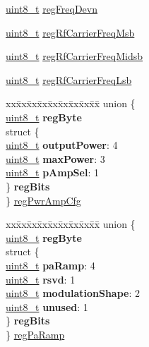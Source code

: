 \begin{DoxyCompactItemize}
\begin{tabbing}
\end{tabbing}\item 
\hyperlink{vl53l0x__types_8h_aba7bc1797add20fe3efdf37ced1182c5}{uint8\+\_\+t} \hyperlink{structFSK__Register__Map_a9265cac0c8d83f3c76e1a5fb5015ac88}{reg\+Freq\+Devn}
\item 
\hyperlink{vl53l0x__types_8h_aba7bc1797add20fe3efdf37ced1182c5}{uint8\+\_\+t} \hyperlink{structFSK__Register__Map_a84f971eeca1481b55775180b7f0b2594}{reg\+Rf\+Carrier\+Freq\+Msb}
\item 
\hyperlink{vl53l0x__types_8h_aba7bc1797add20fe3efdf37ced1182c5}{uint8\+\_\+t} \hyperlink{structFSK__Register__Map_a66036617e184731963f9539360b35de7}{reg\+Rf\+Carrier\+Freq\+Midsb}
\item 
\hyperlink{vl53l0x__types_8h_aba7bc1797add20fe3efdf37ced1182c5}{uint8\+\_\+t} \hyperlink{structFSK__Register__Map_aa44e65485b0af36e94eb0278b1dfe169}{reg\+Rf\+Carrier\+Freq\+Lsb}
\item 
\begin{tabbing}
xx\=xx\=xx\=xx\=xx\=xx\=xx\=xx\=xx\=\kill
union \{\\
\>\hyperlink{vl53l0x__types_8h_aba7bc1797add20fe3efdf37ced1182c5}{uint8\_t} {\bfseries regByte}\\
\>struct \{\\
\>\>\hyperlink{vl53l0x__types_8h_aba7bc1797add20fe3efdf37ced1182c5}{uint8\_t} {\bfseries outputPower}: 4\\
\>\>\hyperlink{vl53l0x__types_8h_aba7bc1797add20fe3efdf37ced1182c5}{uint8\_t} {\bfseries maxPower}: 3\\
\>\>\hyperlink{vl53l0x__types_8h_aba7bc1797add20fe3efdf37ced1182c5}{uint8\_t} {\bfseries pAmpSel}: 1\\
\>\} {\bfseries regBits}\\
\} \hyperlink{structFSK__Register__Map_a5f33d669890f7b2d49a00c705abcf87c}{regPwrAmpCfg}\\

\end{tabbing}\item 
\begin{tabbing}
xx\=xx\=xx\=xx\=xx\=xx\=xx\=xx\=xx\=\kill
union \{\\
\>\hyperlink{vl53l0x__types_8h_aba7bc1797add20fe3efdf37ced1182c5}{uint8\_t} {\bfseries regByte}\\
\>struct \{\\
\>\>\hyperlink{vl53l0x__types_8h_aba7bc1797add20fe3efdf37ced1182c5}{uint8\_t} {\bfseries paRamp}: 4\\
\>\>\hyperlink{vl53l0x__types_8h_aba7bc1797add20fe3efdf37ced1182c5}{uint8\_t} {\bfseries rsvd}: 1\\
\>\>\hyperlink{vl53l0x__types_8h_aba7bc1797add20fe3efdf37ced1182c5}{uint8\_t} {\bfseries modulationShape}: 2\\
\>\>\hyperlink{vl53l0x__types_8h_aba7bc1797add20fe3efdf37ced1182c5}{uint8\_t} {\bfseries unused}: 1\\
\>\} {\bfseries regBits}\\
\} \hyperlink{structFSK__Register__Map_aceb5d027a6484f87b90f5611c5efa8ce}{regPaRamp}\\


\end{tabbing}
\end{DoxyCompactItemize}
